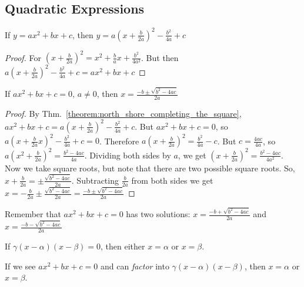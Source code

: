 \documentclass[crop=false,class=book,oneside]{standalone}
\begin{document}
        \subsection{Quadratic Expressions}
            \begin{theorem}
            \label{theorem:north_shore_completing_the_square}
            If $y=ax^{2}+bx+c$, then $y=a(x+\frac{b}{2a})^{2}-\frac{b^2}{4a}+c$
            \end{theorem}
            \begin{proof}
            For $(x+\frac{b}{2a})^{2}=x^{2}+\frac{b}{a}x+\frac{b^{2}}{4a^{2}}$. But then $a(x+\frac{b}{2a})^{2}-\frac{b^{2}}{4a}+c=ax^{2}+bx+c$
            \end{proof}
            \begin{theorem}
            \label{theorem:north_shore_quadratic_formula_theorem}
            If $ax^{2}+bx+c=0$, $a\ne 0$, then $x=\frac{-b\pm\sqrt{b^{2}-4ac}}{2a}$
            \end{theorem}
            \begin{proof}
            By Thm.~\ref{theorem:north_shore_completing_the_square}, $ax^{2}+bx+c=a(x+\frac{b}{2a})^{2}-\frac{b^{2}}{4a}+c$. But $ax^{2}+bx+c=0$, so $a(x+\frac{b}{2a}x)^{2}-\frac{b^{2}}{4a}+c=0$. Therefore $a(x+\frac{b}{2a})^{2}=\frac{b^2}{4a}-c$. But $c=\frac{4ac}{4a}$, so $a(x^2+\frac{b}{2a})^{2}=\frac{b^{2}-4ac}{4a}$. Dividing both sides by $a$, we get $(x+\frac{b}{2a})^{2}=\frac{b^{2}-4ac}{4a^{2}}$. Now we take square roots, but note that there are two possible square roots. So, $x+\frac{b}{2a}=\pm\frac{\sqrt{b^{2}-4ac}}{2a}$. Subtracting $\frac{b}{2a}$ from both sides we get $x=-\frac{b}{2a}\pm\frac{\sqrt{b^{2}-4ac}}{2a}=\frac{-b\pm\sqrt{b^{2}-4ac}}{2a}$
            \end{proof}
            \begin{remark}
            Remember that $ax^{2}+bx+c=0$ has two solutions: $x=\frac{-b+\sqrt{b^{2}-4ac}}{2a}$ and $x=\frac{-b-\sqrt{b^{2}-4ac}}{2a}$
            \end{remark}
            \begin{theorem}
            \label{theorem:north_shore_zeros_of_a_factored_polynomial}
            If $\gamma(x-\alpha)(x-\beta)=0$, then either $x=\alpha$ or $x=\beta$.
            \end{theorem}
            \begin{remark}
            If we see $ax^{2}+bx+c=0$ and can \textit{factor} into $\gamma(x-\alpha)(x-\beta)$, then $x=\alpha$ or $x=\beta$.
            \end{remark}
\end{document}
